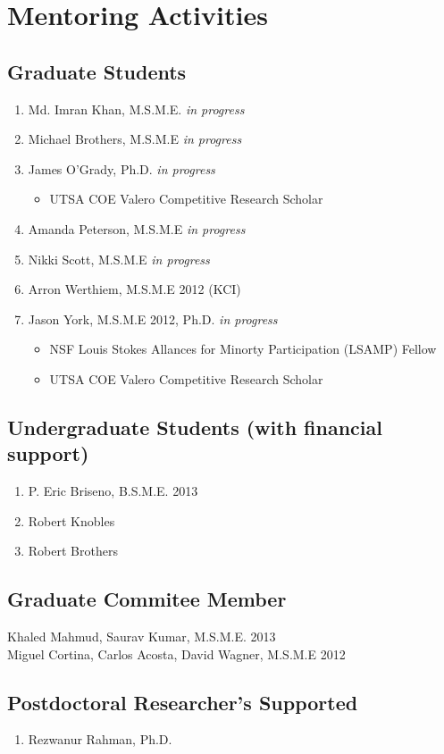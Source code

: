 \section*{Mentoring Activities}


\subsection*{Graduate Students}

\begin{enumerate}
  \item Md. Imran Khan, M.S.M.E. \emph{in progress}
  \item Michael Brothers, M.S.M.E \emph{in progress}
  \item James O'Grady, Ph.D. \emph{in progress}
      \begin{itemize}
        \item UTSA COE Valero Competitive Research Scholar
      \end{itemize}
    \item Amanda Peterson, M.S.M.E \emph{in progress}
    \item Nikki Scott, M.S.M.E \emph{in progress}
    \item Arron Werthiem, M.S.M.E 2012 (KCI)
    \item Jason York, M.S.M.E 2012, Ph.D. \emph{in progress}
      \begin{itemize}
        \item NSF Louis Stokes Allances for Minorty Participation (LSAMP) Fellow
        \item UTSA COE Valero Competitive Research Scholar
      \end{itemize}
\end{enumerate}

\subsection*{Undergraduate Students (with financial support)}
  \begin{enumerate}
    \item P. Eric Briseno, B.S.M.E. 2013
    \item Robert Knobles
    \item Robert Brothers
  \end{enumerate}

\subsection*{Graduate Commitee Member}
Khaled Mahmud, Saurav Kumar, M.S.M.E. 2013 \\
Miguel Cortina, Carlos Acosta, David Wagner, M.S.M.E 2012 

\subsection*{Postdoctoral Researcher's Supported}
  \begin{enumerate}
    \item Rezwanur Rahman, Ph.D.
  \end{enumerate}

